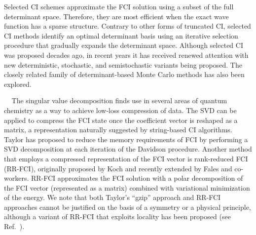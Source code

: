 \documentclass[aip,jcp,amsmath,amssymb, preprint]{revtex4-1}
\newcommand{\add}[1]{\colorbox{goodgreen}{\textcolor{white}{\footnotesize  \fontfamily{phv}\selectfont +}}
    \textcolor{goodgreen}{{#1}}\xspace}
\begin{document}
Selected CI schemes approximate the FCI solution using a subset of the full determinant space. Therefore, they are most efficient when the exact wave function has a sparse structure.
Contrary to other forms of truncated CI, selected CI methods identify an optimal determinant basis using an iterative selection procedure that gradually expands the determinant space.
Although selected CI \cite{Huron1973IterativePerturbation, Buenker1974IndividualizedConfiguration, Buenker1975EnergyExtrapolation, Evangelisti1983ConvergenceOf} was proposed decades ago, in recent years it has received renewed attention with new deterministic,\cite{Garcia1995AnIterative, Neese2003ASpectroscopy, Nakatsuji2005IterativeCI, Abrams2005ImportantConfigurations, Bytautas2009APriori, Roth2009ImportanceTruncation, Evangelista2014Adaptive, Knowles2015CompressiveSampling, Liu2016iCI, Schriber2016Adaptive, Holmes2016HeatBath, Schriber2017Adaptive} stochastic,\cite{Greer1995Estimating, Greer1998MonteCarlo, Coe2014ApplyingMonte, Coe2013StateAveraged, Coe2012DevelopmentOf, Gyorffy2008MonteCarlo} and semistochastic\cite{Sharma2017SemistochasticHeat, Holmes2017ExcitedStates, Chien2018ExcitedStates, li2018fast} variants being proposed.
The closely related family of determinant-based Monte Carlo methods\cite{Booth2009FermionMonte, Cleland2010SurvivalOf, Booth2011BreakingThe, Cleland2011AStudy, Cleland2012TamingThe, Thomas2014SymmetryBreaking, Booth2014LinearScaling, Li2016CombiningThe} has also been explored.

\add{
The singular value decomposition finds use in several areas of quantum chemistry as a way to achieve low-loss compression of data.\cite{Kinoshita2003SingularValue, Hino2004SingularValue,Lewis2016ClusteredLow,Lowdin1956NaturalOrbitals, Bischoff2011LowOrder, Malmqvist2012TheBinatural, Beran2004ExtracrtingPair, Mayer2007UsingSingular}
The SVD can be applied to compress the FCI state once the coefficient vector is reshaped as a matrix, a representation naturally suggested by string-based CI algorithms.\cite{Knowles:1984ud}
Taylor has proposed to reduce the memory requirements of FCI by performing a SVD decomposition at each iteration of the Davidson procedure.\cite{Taylor2013LosslessCompression}
Another method that employs a compressed representation of the FCI vector is rank-reduced  FCI (RR-FCI), originally proposed by Koch\cite{Koch1992AVariational} and recently extended by Fales and co-workers.\cite{Fales2018LargeScale}
RR-FCI approximates the FCI solution with a polar decomposition of the FCI vector (represented as a matrix) combined with variational minimization of the energy.
We note that both Taylor's ``gzip'' approach and RR-FCI approaches cannot be justified on the basis of a symmetry or a physical principle, although a variant of RR-FCI that exploits locality has been proposed (see Ref.~\citenum{Weinstein2011ReducingMemory}).}
\end{document}
